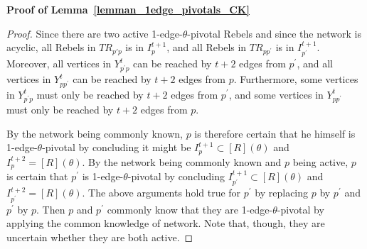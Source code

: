 \documentclass[12pt,letter]{article}
\newtheorem*{lemma*}{Lemma}
\theoremstyle{definition}
\theoremstyle{remark}
\theoremstyle{claim}
\begin{document}
\bigskip
\noindent\textbf{Proof of Lemma~\ref{lemman_1edge_pivotals_CK}}
\begin{proof}
Since there are two active 1-edge-$\theta$-pivotal Rebels and since the network is acyclic, all Rebels in $TR_{p{'}p}$ is in $I^{t+1}_{p}$, and all Rebels in $TR_{pp^{'}}$ is in $I^{t+1}_{p^{'}}$. Moreover, all vertices in $Y^t_{p^{'}p}$ can be reached by $t+2$ edges from $p^{'}$, and all vertices in $Y^t_{pp^{'}}$ can be reached by $t+2$ edges from $p$. Furthermore, some vertices in $Y^t_{p^{'}p}$ must only be reached by $t+2$ edges from $p^{'}$, and some vertices in $Y^t_{pp^{'}}$ must only be reached by $t+2$ edges from $p$. 

By the network being commonly known, $p$ is therefore certain that he himself is 1-edge-$\theta$-pivotal by concluding it might be $I^{t+1}_{p}\subset [R](\theta)$ and $I^{t+2}_{p}=[R](\theta)$. By the network being commonly known and $p$ being active, $p$ is certain that $p^{'}$ is 1-edge-$\theta$-pivotal by concluding $I^{t+1}_{p^{'}}\subset [R](\theta)$ and $I^{t+2}_{p^{'}}=[R](\theta)$. The above arguments hold true for $p^{'}$ by replacing $p$ by $p^{'}$ and $p^{'}$ by $p$. Then $p$ and $p^{'}$ commonly know that they are 1-edge-$\theta$-pivotal by applying the common knowledge of network. Note that, though, they are uncertain whether they are both active.
\end{proof}
\bigskip
\end{document}
